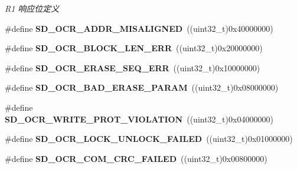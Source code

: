 \begin{DoxyCompactItemize}
\begin{DoxyCompactList}\small\item\em R1 响应位定义 \end{DoxyCompactList}\item 
\#define {\bfseries S\+D\+\_\+\+O\+C\+R\+\_\+\+A\+D\+D\+R\+\_\+\+M\+I\+S\+A\+L\+I\+G\+N\+ED}~((uint32\+\_\+t)0x40000000)\hypertarget{group__sd__card__private_ga540633bf8f3289c628063e2c1bd5f9ab}{}\label{group__sd__card__private_ga540633bf8f3289c628063e2c1bd5f9ab}

\item 
\#define {\bfseries S\+D\+\_\+\+O\+C\+R\+\_\+\+B\+L\+O\+C\+K\+\_\+\+L\+E\+N\+\_\+\+E\+RR}~((uint32\+\_\+t)0x20000000)\hypertarget{group__sd__card__private_gad528da3ef5cf61ecf6d500a9b527c3e9}{}\label{group__sd__card__private_gad528da3ef5cf61ecf6d500a9b527c3e9}

\item 
\#define {\bfseries S\+D\+\_\+\+O\+C\+R\+\_\+\+E\+R\+A\+S\+E\+\_\+\+S\+E\+Q\+\_\+\+E\+RR}~((uint32\+\_\+t)0x10000000)\hypertarget{group__sd__card__private_ga749b810615490fcf173d5355a6f42075}{}\label{group__sd__card__private_ga749b810615490fcf173d5355a6f42075}

\item 
\#define {\bfseries S\+D\+\_\+\+O\+C\+R\+\_\+\+B\+A\+D\+\_\+\+E\+R\+A\+S\+E\+\_\+\+P\+A\+R\+AM}~((uint32\+\_\+t)0x08000000)\hypertarget{group__sd__card__private_gadbeb08085e7282275fd5684b5d59d5aa}{}\label{group__sd__card__private_gadbeb08085e7282275fd5684b5d59d5aa}

\item 
\#define {\bfseries S\+D\+\_\+\+O\+C\+R\+\_\+\+W\+R\+I\+T\+E\+\_\+\+P\+R\+O\+T\+\_\+\+V\+I\+O\+L\+A\+T\+I\+ON}~((uint32\+\_\+t)0x04000000)\hypertarget{group__sd__card__private_gabe0162775c8357aa31263ec2225bd123}{}\label{group__sd__card__private_gabe0162775c8357aa31263ec2225bd123}

\item 
\#define {\bfseries S\+D\+\_\+\+O\+C\+R\+\_\+\+L\+O\+C\+K\+\_\+\+U\+N\+L\+O\+C\+K\+\_\+\+F\+A\+I\+L\+ED}~((uint32\+\_\+t)0x01000000)\hypertarget{group__sd__card__private_gac9a82e52cc83dd23035bc0fdd9a88cf4}{}\label{group__sd__card__private_gac9a82e52cc83dd23035bc0fdd9a88cf4}

\item 
\#define {\bfseries S\+D\+\_\+\+O\+C\+R\+\_\+\+C\+O\+M\+\_\+\+C\+R\+C\+\_\+\+F\+A\+I\+L\+ED}~((uint32\+\_\+t)0x00800000)\hypertarget{group__sd__card__private_ga75c4da9e9ca6b935c3afb213dda9c7d0}{}\label{group__sd__card__private_ga75c4da9e9ca6b935c3afb213dda9c7d0}


\end{DoxyCompactItemize}
